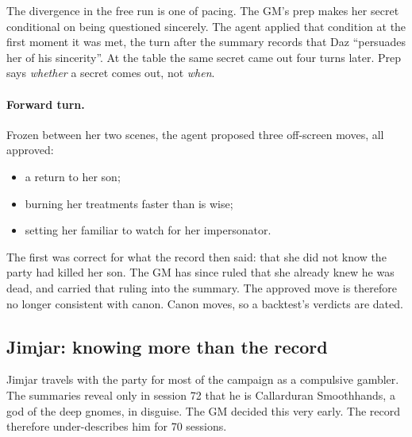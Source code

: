 \documentclass[11pt]{article}
\begin{document}
The divergence in the free run is one of pacing. The GM's prep makes her secret
conditional on being questioned sincerely. The agent applied that condition at the
first moment it was met, the turn after the summary records that Daz ``persuades her
of his sincerity''. At the table the same secret came out four turns later. Prep says
\emph{whether} a secret comes out, not \emph{when}.

\paragraph{Forward turn.}
Frozen between her two scenes, the agent proposed three off-screen moves, all
approved:
\begin{itemize}[nosep]
\item a return to her son;
\item burning her treatments faster than is wise;
\item setting her familiar to watch for her impersonator.
\end{itemize}
The first was correct for what the record then said: that she did not know the party
had killed her son. The GM has since ruled that she already knew he was dead, and
carried that ruling into the summary. The approved move is therefore no longer
consistent with canon. Canon moves, so a backtest's verdicts are dated.

\subsection{Jimjar: knowing more than the record}\label{sec:jimjar}

Jimjar travels with the party for most of the campaign as a compulsive gambler. The
summaries reveal only in session 72 that he is Callarduran Smoothhands, a god of the
deep gnomes, in disguise. The GM decided this very early. The record therefore
under-describes him for 70 sessions.
\end{document}
